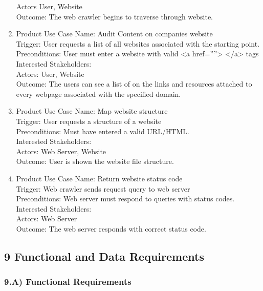 \documentclass[12pt]{article}
\begin{document}
\begin{enumerate}
Actors User, Website\\
Outcome: The web crawler begins to traverse through website.\\
  \item Product Use Case Name: Audit Content on companies website \\
Trigger: User requests a list of all websites associated with the starting point.\\
Preconditions: User must enter a website with valid <a href=””> </a> tags\\
Interested Stakeholders: \\
Actors: User, Website\\
Outcome: The users can see a list of on the links and resources attached to every webpage associated with the specified domain.\\
  \item Product Use Case Name: Map website structure\\
Trigger: User requests a structure of a website\\
Preconditions: Must have entered a valid URL/HTML.\\
Interested Stakeholders: \\
Actors: Web Server, Website\\
Outcome: User is shown the website file structure.\\
  \item Product Use Case Name: Return website status code\\
Trigger: Web crawler sends request query to web server\\
Preconditions: Web server must respond to queries with status codes. \\
Interested Stakeholders: \\
Actors: Web Server\\
Outcome: The web server responds with correct status code.\\
\end{enumerate}

\subsection{9 Functional and Data Requirements}

\subsubsection{9.A) Functional Requirements}
\end{document}
